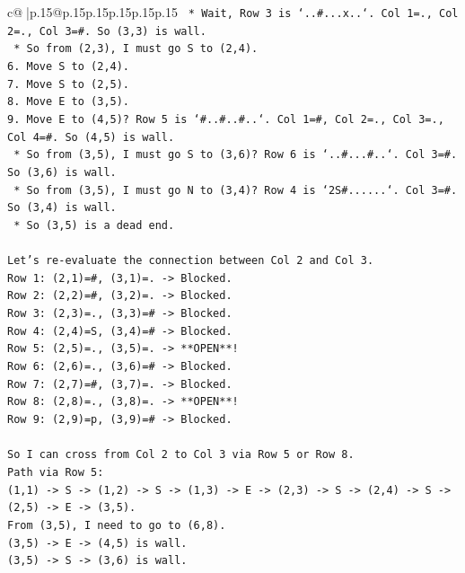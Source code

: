\documentclass{article}
\begin{document}
{\begin{supertabular}{c@{$\;$}|p{.15\linewidth}@{}p{.15\linewidth}p{.15\linewidth}p{.15\linewidth}p{.15\linewidth}p{.15\linewidth}}
{{{\texttt{    *   Wait, Row 3 is `..\#...x..`. Col 1=., Col 2=., Col 3=\#. So (3,3) is wall.} \\
\texttt{    *   So from (2,3), I must go S to (2,4).} \\
\texttt{6.  Move S to (2,4).} \\
\texttt{7.  Move S to (2,5).} \\
\texttt{8.  Move E to (3,5).} \\
\texttt{9.  Move E to (4,5)? Row 5 is `\#..\#..\#..`. Col 1=\#, Col 2=., Col 3=., Col 4=\#. So (4,5) is wall.} \\
\texttt{    *   So from (3,5), I must go S to (3,6)? Row 6 is `..\#...\#..`. Col 3=\#. So (3,6) is wall.} \\
\texttt{    *   So from (3,5), I must go N to (3,4)? Row 4 is `2S\#......`. Col 3=\#. So (3,4) is wall.} \\
\texttt{    *   So (3,5) is a dead end.} \\
\\ 
\texttt{Let's re{-}evaluate the connection between Col 2 and Col 3.} \\
\texttt{Row 1: (2,1)=\#, (3,1)=. {-}> Blocked.} \\
\texttt{Row 2: (2,2)=\#, (3,2)=. {-}> Blocked.} \\
\texttt{Row 3: (2,3)=., (3,3)=\# {-}> Blocked.} \\
\texttt{Row 4: (2,4)=S, (3,4)=\# {-}> Blocked.} \\
\texttt{Row 5: (2,5)=., (3,5)=. {-}> **OPEN**!} \\
\texttt{Row 6: (2,6)=., (3,6)=\# {-}> Blocked.} \\
\texttt{Row 7: (2,7)=\#, (3,7)=. {-}> Blocked.} \\
\texttt{Row 8: (2,8)=., (3,8)=. {-}> **OPEN**!} \\
\texttt{Row 9: (2,9)=p, (3,9)=\# {-}> Blocked.} \\
\\ 
\texttt{So I can cross from Col 2 to Col 3 via Row 5 or Row 8.} \\
\texttt{Path via Row 5:} \\
\texttt{(1,1) {-}> S {-}> (1,2) {-}> S {-}> (1,3) {-}> E {-}> (2,3) {-}> S {-}> (2,4) {-}> S {-}> (2,5) {-}> E {-}> (3,5).} \\
\texttt{From (3,5), I need to go to (6,8).} \\
\texttt{(3,5) {-}> E {-}> (4,5) is wall.} \\
\texttt{(3,5) {-}> S {-}> (3,6) is wall.} \\
}}}
\end{supertabular}}
\end{document}

